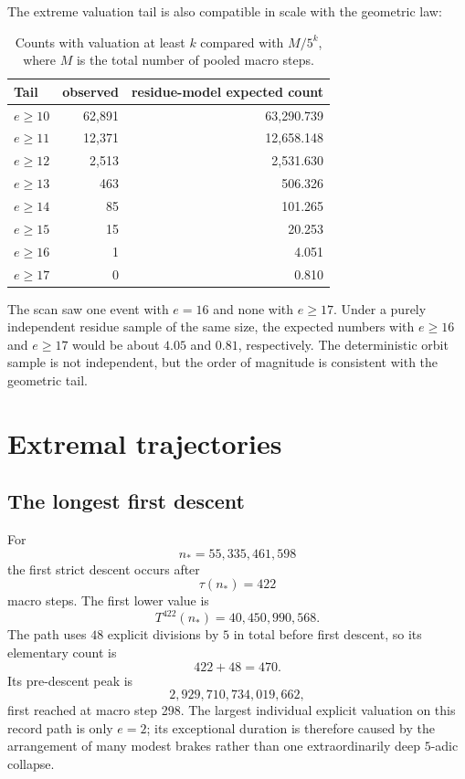 \documentclass[11pt]{article}
\theoremstyle{definition}
\begin{document}
The extreme valuation tail is also compatible in scale with the geometric law:
\begin{table}[H]
\centering
\caption{Counts with valuation at least $k$ compared with $M/5^k$, where $M$ is the total number of pooled macro steps.}
\begin{tabular}{lrr}
\toprule
Tail & observed & residue-model expected count\\
\midrule
$e\ge 10$ & 62{{,}}891 & 63{,}290.739 \\
$e\ge 11$ & 12{{,}}371 & 12{,}658.148 \\
$e\ge 12$ & 2{{,}}513 & 2{,}531.630 \\
$e\ge 13$ & 463 & 506.326 \\
$e\ge 14$ & 85 & 101.265 \\
$e\ge 15$ & 15 & 20.253 \\
$e\ge 16$ & 1 & 4.051 \\
$e\ge 17$ & 0 & 0.810 \\
\bottomrule
\end{tabular}
\end{table}
The scan saw one event with $e=16$ and none with $e\ge17$. Under a purely independent residue sample of the same size, the expected numbers with $e\ge16$ and $e\ge17$ would be about $4.05$ and $0.81$, respectively. The deterministic orbit sample is not independent, but the order of magnitude is consistent with the geometric tail.

\section{Extremal trajectories}

\subsection{The longest first descent}

For
\[
n_*=55{,}335{,}461{,}598
\]
the first strict descent occurs after
\[
\tau(n_*)=422
\]
macro steps. The first lower value is
\[
T^{422}(n_*)=40{,}450{,}990{,}568.
\]
The path uses $48$ explicit divisions by $5$ in total before first descent, so its elementary count is
\[
422+48=470.
\]
Its pre-descent peak is
\[
2{,}929{,}710{,}734{,}019{,}662,
\]
first reached at macro step 298. The largest individual explicit valuation on this record path is only $e=2$; its exceptional duration is therefore caused by the arrangement of many modest brakes rather than one extraordinarily deep $5$-adic collapse.
\end{document}
